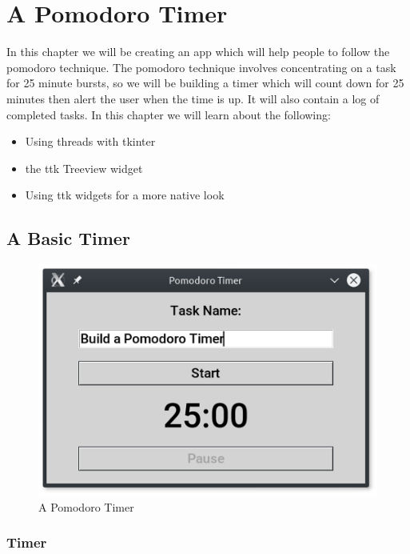 \documentclass[a4paper,11pt,openany]{book}
\begin{document}
\chapter{A Pomodoro Timer}
In this chapter we will be creating an app which will help people to follow the pomodoro technique. The pomodoro technique involves concentrating on a task for 25 minute bursts, so we will be building a timer which will count down for 25 minutes then alert the user when the time is up. It will also contain a log of completed tasks. In this chapter we will learn about the following:

\begin{itemize}
  \item Using threads with tkinter
  \item the ttk Treeview widget
  \item Using ttk widgets for a more native look
\end{itemize}

\section{A Basic Timer}

\begin{figure}[h]
\centering
\includegraphics{Ch7-1}
\caption{A Pomodoro Timer}
\end{figure}



\subsection{Timer}
\end{document}
